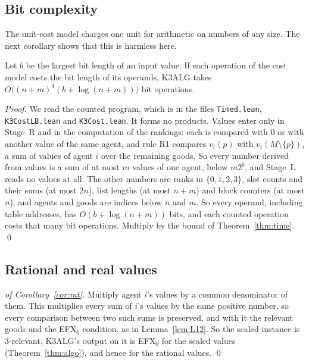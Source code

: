 \documentclass[runningheads,11pt]{llncs}
\newcommand{\efxz}{\texorpdfstring{\mbox{EFX$_0$}}{EFX0}}
\begin{document}
\subsection{Bit complexity}\label{sec:bits}

The unit-cost model charges one unit for arithmetic on numbers of any size. The next corollary shows that this is harmless here.

\begin{corollary}\label{cor:bits}
Let $b$ be the largest bit length of an input value. If each operation of the cost model costs the bit length of its operands, K3ALG takes $O\big((n+m)^4(b+\log(n+m))\big)$ bit operations.
\end{corollary}

\begin{proof}
We read the counted program, which is in the files \texttt{Timed.lean}, \texttt{K3CostLB.lean} and \texttt{K3Cost.lean}. It forms no products. Values enter only in Stage~R and in the computation of the rankings: each is compared with $0$ or with another value of the same agent, and rule R1 compares $v_i(p)$ with $v_i(M\setminus\{p\})$, a sum of values of agent $i$ over the remaining goods. So every number derived from values is a sum of at most $m$ values of one agent, below $m2^b$, and Stage~L reads no values at all. The other numbers are ranks in $\{0,1,2,3\}$, slot counts and their sums (at most $2n$), list lengths (at most $n+m$) and block counters (at most $n$), and agents and goods are indices below $n$ and $m$. So every operand, including table addresses, has $O(b+\log(n+m))$ bits, and each counted operation costs that many bit operations. Multiply by the bound of Theorem~\ref{thm:time}. \qed
\end{proof}

\subsection{Rational and real values}\label{sec:ratreal}

\begin{proof}[of Corollary~\ref{cor:rat}]
Multiply agent $i$'s values by a common denominator of them. This multiplies every sum of $i$'s values by the same positive number, so every comparison between two such sums is preserved, and with it the relevant goods and the \efxz{} condition, as in Lemma~\ref{lem:L12}. So the scaled instance is $3$-relevant, K3ALG's output on it is \efxz{} for the scaled values (Theorem~\ref{thm:algo}), and hence for the rational values. \qed
\end{proof}
\end{document}
